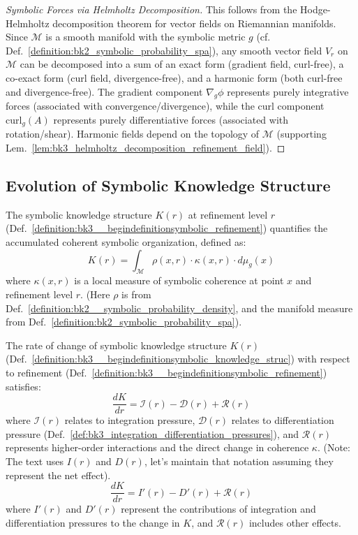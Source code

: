 \begin{proof}[Symbolic Forces via Helmholtz Decomposition]
\label{proof:bk3_symbolic_helmholtz_decomposition}
This follows from the Hodge-Helmholtz decomposition theorem for vector fields on Riemannian manifolds. Since $\mathcal{M}$ is a smooth manifold with the symbolic metric $g$ (cf. Def.~\ref{definition:bk2_symbolic_probability_spa}), any smooth vector field $V_r$ on $\mathcal{M}$ can be decomposed into a sum of an exact form (gradient field, curl-free), a co-exact form (curl field, divergence-free), and a harmonic form (both curl-free and divergence-free). The gradient component $\nabla_g \phi$ represents purely integrative forces (associated with convergence/divergence), while the curl component $\text{curl}_g(A)$ represents purely differentiative forces (associated with rotation/shear). Harmonic fields depend on the topology of $\mathcal{M}$ (supporting Lem.~\ref{lem:bk3_helmholtz_decomposition_refinement_field}).
\end{proof}

\subsection{Evolution of Symbolic Knowledge Structure} \label{subsec:bk3_evolution_symbolic_knowledge_structure}

\begin{definition} \label{definition:bk3__begindefinitionsymbolic_knowledge_struc}
The symbolic knowledge structure $K(r)$ at refinement level $r$ (Def.~\ref{definition:bk3__begindefinitionsymbolic_refinement}) quantifies the accumulated coherent symbolic organization, defined as:
\[
K(r) = \int_{\mathcal{M}} \rho(x,r) \cdot \kappa(x,r) \cdot d\mu_g(x)
\]
where $\kappa(x,r)$ is a local measure of symbolic coherence at point $x$ and refinement level $r$. (Here $\rho$ is from Def.~\ref{definition:bk2__symbolic_probability_density}, and the manifold measure from Def.~\ref{definition:bk2_symbolic_probability_spa}).
\end{definition}

\begin{theorem} \label{theorem:bk3__begintheoremevolution_of_symbolic_knowl}
The rate of change of symbolic knowledge structure $K(r)$ (Def.~\ref{definition:bk3__begindefinitionsymbolic_knowledge_struc}) with respect to refinement (Def.~\ref{definition:bk3__begindefinitionsymbolic_refinement}) satisfies:
\[
\frac{dK}{dr} = \mathcal{I}(r) - \mathcal{D}(r) + \mathcal{R}(r)
\]
where $\mathcal{I}(r)$ relates to integration pressure, $\mathcal{D}(r)$ relates to differentiation pressure (Def.~\ref{def:bk3_integration_differentiation_pressures}), and $\mathcal{R}(r)$ represents higher-order interactions and the direct change in coherence $\kappa$. (Note: The text uses $I(r)$ and $D(r)$, let's maintain that notation assuming they represent the net effect).
\[
\frac{dK}{dr} = I'(r) - D'(r) + \mathcal{R}(r)
\]
where $I'(r)$ and $D'(r)$ represent the contributions of integration and differentiation pressures to the change in $K$, and $\mathcal{R}(r)$ includes other effects.
\end{theorem}

